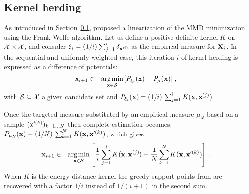 \subsection{Kernel herding}\label{sec:KH}
As introduced in Section~\ref{sec:KH}, \citet{lacoste_2015} proposed a linearization of the MMD minimization using the Frank-Wolfe algorithm. 
Let us define a positive definite kernel $K$ on $\mathcal{X}\times\mathcal{X}$, and consider $\xi_i=(1/i)\sum_{j=1}^i \delta_{{\bf x}^{(i)}}$ as the empirical measure for ${\bf X}_i$.  
In the sequential and uniformly weighted case, this iteration $i$ of kernel herding is expressed as a difference of potentials: 
\begin{eqnarray}\label{eq:KH}
{\bf x}_{i+1} &\in& \operatorname*{arg\,min}_{{\bf x}\in\mathcal{S}} \left[P_{\xi_i}({\bf x})-P_{\mu}({\bf x})\right] \,,
\end{eqnarray}
with $\mathcal{S}\subseteq\mathcal{X}$ a given candidate set and $P_{\xi_i}({\bf x}) = (1/i)\, \sum_{j=1}^i K({\bf x}, {\bf x}^{(j)})$. 

Once the targeted measure substituted by an empirical measure $\mu_N$ based on a sample $({\bf x}'^{(k)})_{k=1\ldots N}$ then complete estimation becomes: 
$P_{\mu_N}({\bf x}) = (1/N)\, \sum_{k=1}^N K({\bf x}, {\bf x}'^{(k)})$, which gives
\begin{eqnarray*}
{\bf x}_{i+1} &\in& \operatorname*{arg\,min}_{{\bf x}\in\mathcal{S}} \left[ \frac{1}{i} \sum_{j=1}^{i} K({\bf x},{\bf x}^{(j)}) - \frac{1}{N} \sum_{k=1}^N K({\bf x},{\bf x}'^{(k)}) \right] \,.
\end{eqnarray*}
When $K$ is the energy-distance kernel  the greedy support points from  are recovered with a factor $1/i$ instead of $1/(i+1)$ in the second sum. 

